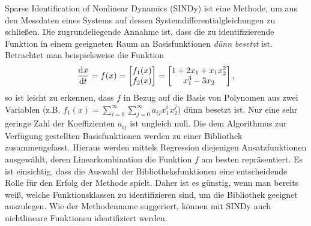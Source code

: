 
Sparse Identification of Nonlinear Dynamics (SINDy) ist eine Methode, um aus den Messdaten eines Systems auf dessen Systemdifferentialgleichungen zu schließen. Die zugrundeliegende Annahme ist, dass die zu identifizierende Funktion in einem geeigneten Raum an Basisfunktionen \textit{dünn besetzt} ist. Betrachtet man beispielsweise die Funktion
\begin{equation}
\frac{\mathrm{d}^{}x}{\mathrm{d}{t}^{}} = f(x) = \begin{bmatrix} f_1(x)\\ f_2(x)\\ \end{bmatrix}
=\begin{bmatrix} 1+2x_1+x_1x_2^2 \\ x_1^3-3x_2\\ \end{bmatrix},
\end{equation}
so ist leicht zu erkennen, dass $f$ in Bezug auf die Basis von Polynomen aus zwei Variablen (z.B. $f_1(x)=\sum_{i=0}^{\infty}\sum_{j=0}^{\infty}a_{ij}x_1^ix_2^j$) dünn besetzt ist. Nur eine sehr geringe Zahl der Koeffizienten $a_{ij}$ ist ungleich null. 
Die dem Algorithmus zur Verfügung gestellten Basisfunktionen werden zu einer Bibliothek zusammengefasst. Hieraus werden mittels Regression diejenigen Ansatzfunktionen ausgewählt, deren Linearkombination die Funktion $f$ am besten repräsentiert. Es ist einsichtig, dass die Auswahl der Bibliotheksfunktionen eine entscheidende Rolle für den Erfolg der Methode spielt. Daher ist es günstig, wenn man bereits weiß, welche Funktionsklassen zu identifizieren sind, um die Bibliothek geeignet auszulegen. Wie der Methodenname suggeriert, können mit SINDy auch nichtlineare Funktionen identifiziert werden. 